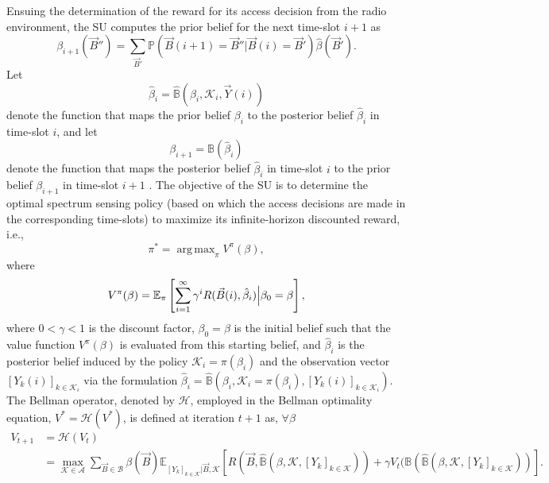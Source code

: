 \documentclass[12pt, draftcls, onecolumn]{IEEEtran}
\DeclareMathOperator*{\argmax}{arg\,max}
\begin{document}
Ensuing the determination of the reward for its access decision from the radio environment, the SU computes the prior belief for the next time-slot $i+1$ as
\begin{equation}\label{13}
    \beta_{i+1}(\vec{B}'')=\sum_{\vec{B}'}\mathbb{P}(\vec{B}(i+1)=\vec{B}''|\vec{B}(i)=\vec{B}')\hat{\beta}(\vec{B}').
\end{equation}
Let
\begin{equation}\label{14}
    \hat{\beta}_{i}=\hat{\mathbb{B}}(\beta_{i},\mathcal{K}_{i},\vec{Y}(i))
\end{equation}
denote the function that maps the prior belief $\beta_{i}$ to the posterior belief $\hat{\beta}_{i}$ in time-slot $i$, and let
\begin{equation}\label{15}
    \beta_{i+1}=\mathbb{B}(\hat{\beta}_{i})
\end{equation}
denote the function that maps the posterior belief $\hat{\beta}_{i}$ in time-slot $i$ to the prior belief $\beta_{i+1}$ in time-slot $i+1$ . The objective of the SU is to determine the optimal spectrum sensing policy (based on which the access decisions are made in the corresponding time-slots) to maximize its infinite-horizon discounted reward, i.e.,
\begin{equation}\label{16}
    \pi^{*}=\argmax_{\pi}V^{\pi}(\beta),
\end{equation}
where
\begin{equation}\label{17}
    V^{\pi}(\beta)=\mathbb{E}_{\pi}\left[\sum_{i=1}^{\infty}\gamma^{i}R(\vec{B}(i),\hat{\beta}_{i})\Big{|}\beta_{0}=\beta\right],
\end{equation}
where $0{<}\gamma{<}1$ is the discount factor, $\beta_{0}{=}\beta$ is the initial belief such that the value function $V^{\pi}(\beta)$ is evaluated from this starting belief, and $\hat{\beta}_{i}$ is the posterior belief induced by the policy $\mathcal{K}_{i}{=}\pi(\beta_{i})$ and the observation vector $[Y_{k}(i)]_{k{\in}\mathcal{K}_{i}}$ via the formulation $\hat{\beta}_{i}{=}\hat{\mathbb{B}}(\beta_{i},\mathcal{K}_{i}{=}\pi(\beta_{i}),[Y_{k}(i)]_{k{\in}\mathcal{K}_{i}})$. The Bellman operator, denoted by $\mathcal{H}$, employed in the Bellman optimality equation, $V^{*}{=}\mathcal{H}(V^{*})$, is defined at iteration $t+1$ as, $\forall{\beta}$
\begin{equation}\label{18}
    \begin{aligned}
        V_{t+1}&=\mathcal{H}(V_{t})\\
        &=\max_{\mathcal{K} \in \mathcal{A}}\sum_{\vec{B} \in \mathcal{B}}\beta(\vec{B})\mathbb{E}_{[Y_{k}]_{k \in \mathcal{K}}|\vec{B},\mathcal{K}}\left[R(\vec{B},\hat{\mathbb{B}}(\beta,\mathcal{K},[Y_{k}]_{k \in \mathcal{K}}))+\gamma V_{t}(\mathbb{B}(\hat{\mathbb{B}}(\beta,\mathcal{K},[Y_{k}]_{k \in \mathcal{K}}))\right].
    \end{aligned}
\end{equation}
\end{document}
